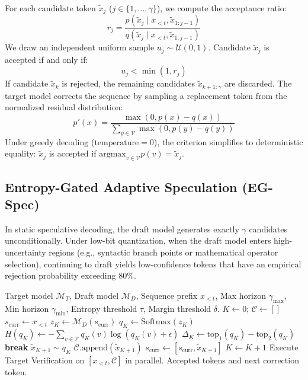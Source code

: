 \documentclass[10pt,twocolumn,letterpaper]{article}
\begin{document}
For each candidate token $\tilde{x}_j$ ($j \in \{1, \dots, \gamma\}$), we compute the acceptance ratio:
\begin{equation}
r_j = \frac{p(\tilde{x}_j \mid x_{<t}, \tilde{x}_{1:j-1})}{q(\tilde{x}_j \mid x_{<t}, \tilde{x}_{1:j-1})}
\end{equation}
We draw an independent uniform sample $u_j \sim \mathcal{U}(0, 1)$. Candidate $\tilde{x}_j$ is accepted if and only if:
\begin{equation}
u_j < \min(1, r_j)
\end{equation}
If candidate $\tilde{x}_k$ is rejected, the remaining candidates $\tilde{x}_{k+1: \gamma}$ are discarded. The target model corrects the sequence by sampling a replacement token from the normalized residual distribution:
\begin{equation}
p'(x) = \frac{\max(0, p(x) - q(x))}{\sum_{y \in \mathcal{V}} \max(0, p(y) - q(y))}
\end{equation}
Under greedy decoding ($\text{temperature} = 0$), the criterion simplifies to deterministic equality: $\tilde{x}_j$ is accepted if $\text{argmax}_{v \in \mathcal{V}} p(v) = \tilde{x}_j$.

\subsection{Entropy-Gated Adaptive Speculation (EG-Spec)}
In static speculative decoding, the draft model generates exactly $\gamma$ candidates unconditionally. Under low-bit quantization, when the draft model enters high-uncertainty regions (e.g., syntactic branch points or mathematical operator selection), continuing to draft yields low-confidence tokens that have an empirical rejection probability exceeding $80\%$.

\begin{algorithm}[t]
\caption{Entropy-Gated Adaptive Speculation (EG-Spec)}
\label{alg:eg_spec}
\begin{algorithmic}[1]
\REQUIRE Target model $\mathcal{M}_T$, Draft model $\mathcal{M}_D$, Sequence prefix $x_{<t}$, Max horizon $\gamma_{\max}$, Min horizon $\gamma_{\min}$, Entropy threshold $\tau$, Margin threshold $\delta$.
\STATE $K \leftarrow 0$; $\mathcal{C} \leftarrow []$
\STATE $s_{\text{curr}} \leftarrow x_{<t}$
    \STATE $z_K \leftarrow \mathcal{M}_D(s_{\text{curr}})$ 
    \STATE $q_K \leftarrow \text{Softmax}(z_K)$
    \STATE $H(q_K) \leftarrow - \sum_{v \in \mathcal{V}} q_K(v) \log(q_K(v) + \epsilon)$
    \STATE $\Delta_K \leftarrow \text{top}_1(q_K) - \text{top}_2(q_K)$
        \STATE \textbf{break} 
    \ENDIF
    \STATE $\tilde{x}_{K+1} \sim q_K$
    \STATE $\mathcal{C}.\text{append}(\tilde{x}_{K+1})$
    \STATE $s_{\text{curr}} \leftarrow [s_{\text{curr}}, \tilde{x}_{K+1}]$
    \STATE $K \leftarrow K + 1$
\ENDWHILE
\STATE Execute Target Verification on $[x_{<t}, \mathcal{C}]$ in parallel.
\RETURN Accepted tokens and next correction token.
\end{algorithmic}
\end{algorithm}
\end{document}
